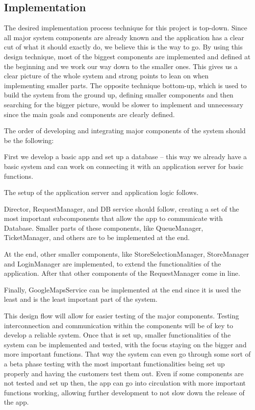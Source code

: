 \newpage

\subsection{Implementation}
\hspace{\parindent}The desired implementation process technique for this project is top-down. Since all major system components are already known and the application has a clear cut of what it should exactly do, we believe this is the way to go. By using this design technique, most of the biggest components are implemented and defined at the beginning and we work our way down to the smaller ones. This gives us a clear picture of the whole system and strong points to lean on when implementing smaller parts. The opposite technique bottom-up, which is used to build the system from the ground up, defining smaller components and then searching for the bigger picture, would be slower to implement and unnecessary since the main goals and components are clearly defined. \newline

The order of developing and integrating major components of the system should be the following:

First we develop a basic app and set up a database – this way we already have a basic system and can work on connecting it with an application server for basic functions. 

The setup of the application server and application logic follows. 

Director, RequestManager, and DB service should follow, creating a set of the most important subcomponents that allow the app to communicate with Database. Smaller parts of these components, like QueueManager, TicketManager, and others are to be implemented at the end. 

At the end, other smaller components, like StoreSelectionManager, StoreManager and LoginManager are implemented, to extend the functionalities of the application. After that other components of the RequestManager come in line. 

Finally, GoogleMapsService can be implemented at the end since it is used the least and is the least important part of the system.  \newline

 

This design flow will allow for easier testing of the major components. Testing interconnection and communication within the components will be of key to develop a reliable system. Once that is set up, smaller functionalities of the system can be implemented and tested, with the focus staying on the bigger and more important functions. That way the system can even go through some sort of a beta phase testing with the most important functionalities being set up properly and having the customers test them out. Even if some components are not tested and set up then, the app can go into circulation with more important functions working, allowing further development to not slow down the release of the app. \newpage

